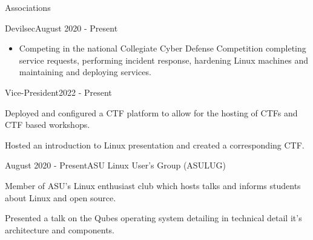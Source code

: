 \documentclass{article}
\newlength{\tabin}
\newlength{\secsep}
\newcommand{\lineunder}{\vspace*{-8pt} \\ \hspace*{-6pt} \hrulefill \\ \vspace*{-15pt}}
\newenvironment{tabbedsection}[1]{
  \begin{list}{}{
      \setlength{\itemsep}{0pt}
      \setlength{\labelsep}{0pt}
      \setlength{\labelwidth}{0pt}
      \setlength{\leftmargin}{0pt}
      \setlength{\rightmargin}{\tabin}
      \setlength{\listparindent}{0pt}
      \setlength{\parsep}{0pt}
      \setlength{\parskip}{0pt}
      \setlength{\partopsep}{0pt}
      \setlength{\topsep}{#1}
    }
  \item[]
}{\end{list}}
\newenvironment{resume_section}[1]{
  \filbreak
  \vspace{2\secsep}
  \textsc{\color{blue}\large#1}
  \lineunder
  \begin{tabbedsection}{\secsep}
}{\end{tabbedsection}}
\newenvironment{resume_subsection}[2]{
  \textbf{\color{BlueViolet}#2} \hfill {\normalsize (#1)} \hspace{-5em}
  \begin{tabbedsection}{0.5\secsep}
  \begin{subitems}
}{\end{subitems}\end{tabbedsection}}
\newenvironment{subitems}{
  \renewcommand{\labelitemi}{-}
  \begin{itemize}
      \setlength{\labelsep}{1em}
}{\end{itemize}}
\newenvironment{resume_employer}[3]{
  \vspace{\secsep}
  \textbf{\color{BlueViolet}#1} \hfill {\normalsize (#3)} \hspace{-5em}
  \begin{tabbedsection}{0pt}
    \ifthenelse{\isempty{#2}}%
        {}%
        {\textbf{#2}}%
}{\end{tabbedsection}}
\newenvironment{resume_position}[2]{
    \vspace{\secsep}
    \textbf{#1} \hfill {\normalsize (#2)} \hspace{-2.64em}
    \begin{subitems}
}{\end{subitems}}
\begin{document}
\begin{resume_section}{Associations}
    \begin{resume_employer}{Devilsec}{}{August 2020 - Present}
        \begin{subitems}
            \item Competing in the national Collegiate Cyber Defense Competition completing service requests, performing incident response, hardening Linux machines and maintaining and deploying services.
        \end{subitems}

        \begin{resume_position}{Vice-President}{2022 - Present}
            \item Deployed and configured a CTF platform to allow for the hosting of CTFs and CTF based workshops.
            \item Hosted an introduction to Linux presentation and created a corresponding CTF.
        \end{resume_position}
    \end{resume_employer}
    \vspace{2\secsep}
    \begin{resume_subsection}{August 2020 - Present}{ASU Linux User's Group (ASULUG)}
        \item Member of ASU's Linux enthusiast club which hosts talks and informs students about Linux and open source.
        \item Presented a talk on the Qubes operating system detailing in technical detail it's architecture and components. \href{https://tayari.gg/talks/qubes-technical-introduction/}{\faExternalLinkSquare*}
    \end{resume_subsection}
\end{resume_section}
\end{document}
